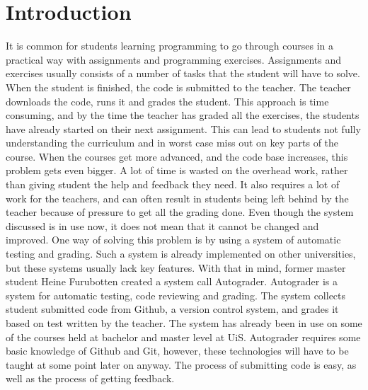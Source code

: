 \documentclass[12pt,a4paper]{report}
\begin{document}
\chapter*{Introduction}

It is common for students learning programming to go through courses in a practical way with assignments and programming exercises. Assignments and exercises usually consists of a number of tasks that the student will have to solve. When the student is finished, the code is submitted to the teacher. The teacher downloads the code, runs it and grades the student. This approach is time consuming, and by the time the teacher has graded all the exercises, the students have already started on their next assignment. This can lead to students not fully understanding the curriculum and in worst case miss out on key parts of the course. When the courses get more advanced, and the code base increases, this problem gets even bigger. A lot of time is wasted on the overhead work, rather than giving student the help and feedback they need. It also requires a lot of work for the teachers, and can often result in students being left behind by the teacher because of pressure to get all the grading done. Even though the system discussed is in use now, it does not mean that it cannot be changed and improved. One way of solving this problem is by using a system of automatic testing and grading. Such a system is already implemented on other universities, but these systems usually lack key features. With that in mind, former master student Heine Furubotten created a system call Autograder. Autograder is a system for automatic testing, code reviewing and grading. The system collects student submitted code from Github, a version control system, and grades it based on test written by the teacher. The system has already been in use on some of the courses held at bachelor and master level at UiS. Autograder requires some basic knowledge of Github and Git, however, these technologies will have to be taught at some point later on anyway. The process of submitting code is easy, as well as the process of getting feedback.
\end{document}
